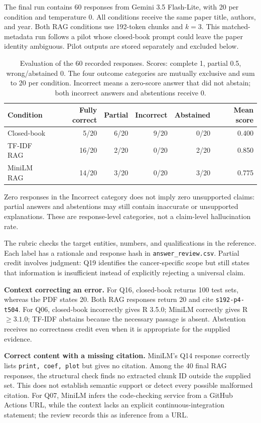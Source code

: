 The final run contains 60 responses from Gemini 3.5 Flash-Lite, with 20 per condition and temperature 0. All conditions receive the same paper title, authors, and year. Both RAG conditions use 192-token chunks and $k=3$. This matched-metadata run follows a pilot whose closed-book prompt could leave the paper identity ambiguous. Pilot outputs are stored separately and excluded below.

\begin{table}[h]\centering\small
\begin{tabular}{lrrrrr}\toprule
Condition & Fully correct & Partial & Incorrect & Abstained & Mean score\\\midrule
Closed-book & 5/20 & 6/20 & 9/20 & 0/20 & 0.400\\
TF-IDF RAG & 16/20 & 2/20 & 0/20 & 2/20 & 0.850\\
MiniLM RAG & 14/20 & 3/20 & 0/20 & 3/20 & 0.775\\\bottomrule
\end{tabular}
\caption{Evaluation of the 60 recorded responses. Scores: complete 1, partial 0.5, wrong/abstained 0. The four outcome categories are mutually exclusive and sum to 20 per condition. Incorrect means a zero-score answer that did not abstain; both incorrect answers and abstentions receive 0.}
\end{table}

Zero responses in the Incorrect category does not imply zero unsupported claims: partial answers and abstentions may still contain inaccurate or unsupported explanations. These are response-level categories, not a claim-level hallucination rate.

The rubric checks the target entities, numbers, and qualifications in the reference. Each label has a rationale and response hash in \texttt{answer\_review.csv}. Partial credit involves judgment: Q19 identifies the cancer-specific scope but still states that information is insufficient instead of explicitly rejecting a universal claim.

\textbf{Context correcting an error.} For Q16, closed-book returns 100 test sets, whereas the PDF states 20. Both RAG responses return 20 and cite \texttt{s192-p4-t504}. For Q06, closed-book incorrectly gives R 3.5.0; MiniLM correctly gives R $\ge3.1.0$; TF-IDF abstains because the necessary passage is absent. Abstention receives no correctness credit even when it is appropriate for the supplied evidence.

\textbf{Correct content with a missing citation.} MiniLM's Q14 response correctly lists \texttt{print, coef, plot} but gives no citation. Among the 40 final RAG responses, the structural check finds no extracted chunk ID outside the supplied set. This does not establish semantic support or detect every possible malformed citation. For Q07, MiniLM infers the code-checking service from a GitHub Actions URL, while the context lacks an explicit continuous-integration statement; the review records this as inference from a URL.

